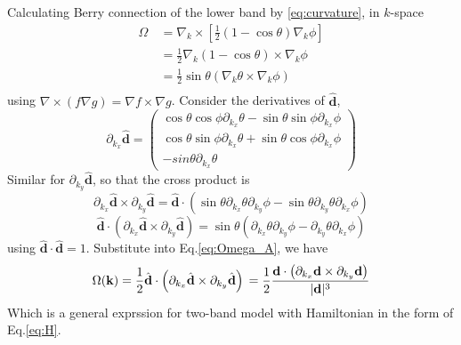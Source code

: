 \documentclass[12pt,a4paper]{article}
\begin{document}
    Calculating Berry connection of the lower band by \eqref{eq:curvature}, in $k$-space
    \begin{equation}
    \label{eq:Omega_A}
    \begin{aligned}
        \Omega
        &\, = \nabla_k \times \left[ \frac{1}{2}\left(1 - \cos\theta\right) \nabla_k\phi \right] \\
        &\, = \frac{1}{2} \nabla_k \left(1 - \cos\theta\right) \times \nabla_k\phi \\
        &\, = \frac{1}{2}\sin\theta \left(\nabla_k \theta \times \nabla_k\phi\right) \\
    \end{aligned}
    \end{equation}
    using $\nabla \times \left(f\nabla g\right) = \nabla f\times \nabla g$. Consider the derivatives of $\hat{\mathbf{d}}$,
    \[
        \partial_{k_x} \hat{\mathbf{d}} = \begin{pmatrix}
            \cos\theta \cos\phi \partial_{k_x}\theta - \sin\theta \sin\phi \partial_{k_x}\phi \\
            \cos\theta \sin\phi \partial_{k_x}\theta + \sin\theta \cos\phi \partial_{k_x}\phi \\
            -sin\theta \partial_{k_x}\theta
        \end{pmatrix}
    \]
    Similar for $\partial_{k_y} \hat{\mathbf{d}}$, so that the cross product is
    \[
        \partial_{k_x} \hat{\mathbf{d}} \times \partial_{k_y} \hat{\mathbf{d}}
        = \hat{\mathbf{d}} \cdot \left(\sin\theta \partial_{k_x}\theta \partial_{k_y}\phi - \sin\theta \partial_{k_y}\theta \partial_{k_x}\phi\right)
    \]
    \[
        \hat{\mathbf{d}} \cdot \left(\partial_{k_x} \hat{\mathbf{d}} \times \partial_{k_y} \hat{\mathbf{d}}\right)
        = \sin\theta \left(\partial_{k_x}\theta \partial_{k_y}\phi - \partial_{k_y}\theta \partial_{k_x}\phi\right)
    \]
    using $\hat{\mathbf{d}}\cdot \hat{\mathbf{d}} = 1$. Substitute into Eq.\eqref{eq:Omega_A}, we have
    \begin{equation}
    \label{eq:twoband}
        \Omega(\mathbf{k})
        = \frac{1}{2} \hat{\mathbf{d}} \cdot \left(\partial_{k_x} \hat{\mathbf{d}} \times \partial_{k_y} \hat{\mathbf{d}}\right) \\
        = \frac{1}{2} \frac{\mathbf{d} \cdot \left(\partial_{k_x}\mathbf{d} \times \partial_{k_y}\mathbf{d}\right)}{|\mathbf{d}|^3} \\
    \end{equation}
    Which is a general exprssion for two-band model with Hamiltonian in the form of Eq.\eqref{eq:H}.
\end{document}
